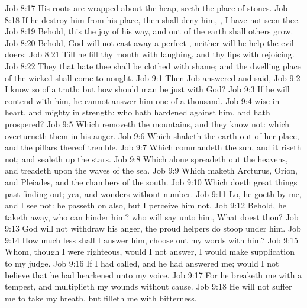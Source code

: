 \vs Job 8:17 His roots are wrapped about the heap,  seeth the place of stones.
\vs Job 8:18 If he destroy him from his place, then  shall deny him, , I have not seen thee.
\vs Job 8:19 Behold, this  the joy of his way, and out of the earth shall others grow.
\vs Job 8:20 Behold, God will not cast away a perfect , neither will he help the evil doers:
\vs Job 8:21 Till he fill thy mouth with laughing, and thy lips with rejoicing.
\vs Job 8:22 They that hate thee shall be clothed with shame; and the dwelling place of the wicked shall come to nought.
\vs Job 9:1 Then Job answered and said,
\vs Job 9:2 I know  so of a truth: but how should man be just with God?
\vs Job 9:3 If he will contend with him, he cannot answer him one of a thousand.
\vs Job 9:4  wise in heart, and mighty in strength: who hath hardened  against him, and hath prospered?
\vs Job 9:5 Which removeth the mountains, and they know not: which overturneth them in his anger.
\vs Job 9:6 Which shaketh the earth out of her place, and the pillars thereof tremble.
\vs Job 9:7 Which commandeth the sun, and it riseth not; and sealeth up the stars.
\vs Job 9:8 Which alone spreadeth out the heavens, and treadeth upon the waves of the sea.
\vs Job 9:9 Which maketh Arcturus, Orion, and Pleiades, and the chambers of the south.
\vs Job 9:10 Which doeth great things past finding out; yea, and wonders without number.
\vs Job 9:11 Lo, he goeth by me, and I see  not: he passeth on also, but I perceive him not.
\vs Job 9:12 Behold, he taketh away, who can hinder him? who will say unto him, What doest thou?
\vs Job 9:13  God will not withdraw his anger, the proud helpers do stoop under him.
\vs Job 9:14 How much less shall I answer him,  choose out my words  with him?
\vs Job 9:15 Whom, though I were righteous,  would I not answer,  I would make supplication to my judge.
\vs Job 9:16 If I had called, and he had answered me;  would I not believe that he had hearkened unto my voice.
\vs Job 9:17 For he breaketh me with a tempest, and multiplieth my wounds without cause.
\vs Job 9:18 He will not suffer me to take my breath, but filleth me with bitterness.
